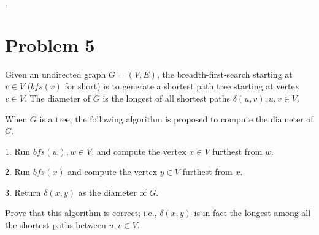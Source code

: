 \documentclass[11pt]{article}
\begin{document}
\newpage.
\section*{Problem 5}

Given an undirected graph $G=(V,E)$, the breadth-first-search starting at $v\in V$
($bfs(v)$ for short) is to generate a shortest path tree starting at vertex
$v\in V$. The diameter of $G$ is the longest of all shortest paths $\delta(u,v), u,v\in V$.
\newline

When $G$ is a tree, the following algorithm is proposed to compute the
diameter of $G$.
\newline

1. Run $bfs(w), w\in V$, and compute the vertex $x\in V$ furthest from $w$.

2. Run $bfs(x)$ and compute the vertex $y\in V$ furthest from $x$.

3. Return $\delta(x,y)$ as the diameter of $G$.
\newline

Prove that this algorithm is correct; i.e., $\delta(x,y)$ is in fact the
longest among all the shortest paths between $u,v\in V$.
\newline

\end{document}

